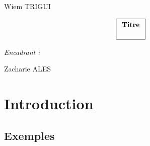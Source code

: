 \documentclass[12pt]{report}
\begin{document}
\pagestyle{fancyplain}
\renewcommand{\chaptermark}[1]{\markboth{\chaptername\ \thechapter. #1}{}}
\renewcommand{\sectionmark}[1]{\markright{\thesection. #1}}
\lhead[]{\fancyplain{}{\bfseries\leftmark}}
\rhead[]{\fancyplain{}{\bfseries\thepage}}
\cfoot{}

\makeatletter
\def\figurename{{\protect\sc \protect\small\bfseries Fig.}}
\def\f@ffrench{\protect\figurename\space{\protect\small\bf \thefigure}\space}
\let\fnum@figure\f@ffrench%
\let\captionORI\caption
\def\caption#1{\captionORI{\rm\small #1}}
\makeatother

\graphicspath{{img/}}

\thispagestyle{empty}
{\Large
\begin{center}
Wiem TRIGUI
\vskip1cm


$$\fbox{$
  \begin{array}{c}
  \textbf{Titre}
  \vphantom{\int_\int}
  \end{array}
  $}
$$
\end{center}
\vskip8cm

\begin{flushright}
\textit{Encadrant :}

Zacharie ALES
\end{flushright}
}

\clearpage

\renewcommand{\baselinestretch}{1.30}\small \normalsize

\tableofcontents

\renewcommand{\baselinestretch}{1.18}\small \normalsize


\chapter{Introduction}

\section{Exemples}
\end{document}
